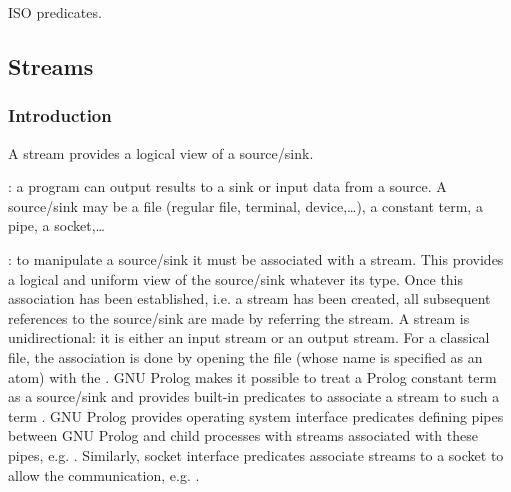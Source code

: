 \begin{PlErrors}





\end{PlErrors}

\Portability

ISO predicates.

\subsection{Streams}
\label{Streams}

\subsubsection{Introduction}
\label{Introduction:(Streams)}
A stream provides a logical view of a source/sink.

: a program can output results to a sink or input
data from a source. A source/sink may be a file (regular file, terminal,
device,\ldots), a constant term, a pipe, a socket,\ldots

: to manipulate a source/sink
it must be associated with a stream. This provides a logical and uniform view
of the source/sink whatever its type. Once this association has been
established, i.e. a stream has been created, all subsequent references to
the source/sink are made by referring the stream. A stream is
unidirectional: it is either an input stream or an output stream. For a
classical file, the association is done by opening the file (whose name is
specified as an atom) with the  . GNU Prolog
makes it possible to treat a Prolog constant term as a source/sink and
provides built-in predicates to associate a stream to such a term
. GNU Prolog provides operating system interface
predicates defining pipes between GNU Prolog and child processes with streams
associated with these pipes, e.g.  .
Similarly, socket interface predicates associate streams to a socket to
allow the communication, e.g. 
.

